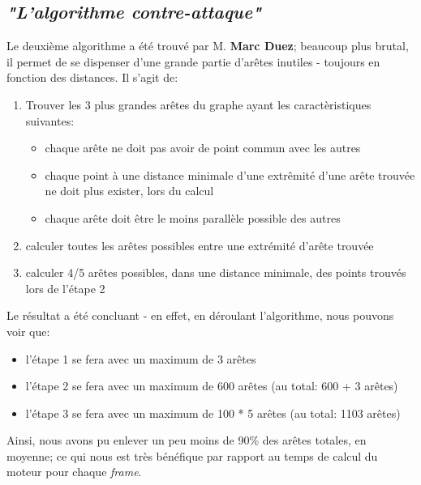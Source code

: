 \documentclass[12pt]{report}
\begin{document}
\begin{spacing}{1.2}
\subsection{\textit{"L'algorithme contre-attaque"}}
Le deuxième algorithme a été trouvé par M. \textbf{Marc Duez}; beaucoup plus brutal, il permet de se dispenser d'une grande partie d'arêtes inutiles - toujours en fonction des distances.
\newline
Il s'agit de:
\begin{enumerate}
\item Trouver les 3 plus grandes arêtes du graphe ayant les caractèristiques suivantes:
	\begin{itemize}
	\item chaque arête ne doit pas avoir de point commun avec les autres
	\item chaque point à une distance minimale d'une extrêmité d'une arête trouvée ne doit plus exister, lors du calcul
	\item chaque arête doit être le moins parallèle possible des autres
	\end{itemize}
\item calculer toutes les arêtes possibles entre une extrémité d'arête trouvée
\item calculer 4/5 arêtes possibles, dans une distance minimale, des points trouvés lors de l'étape 2
\end{enumerate}
Le résultat a été concluant - en effet, en déroulant l'algorithme, nous pouvons voir que:
\begin{itemize}
\item l'étape 1 se fera avec un maximum de 3 arêtes
\item l'étape 2 se fera avec un maximum de 600 arêtes (au total: 600 + 3 arêtes)
\item l'étape 3 se fera avec un maximum de 100 * 5 arêtes (au total: 1103 arêtes)
\end{itemize}
Ainsi, nous avons pu enlever un peu moins de 90\% des arêtes totales, en moyenne; ce qui nous est très bénéfique par rapport au temps de calcul du moteur pour chaque \textit{frame}.


\end{spacing}
\end{document}
